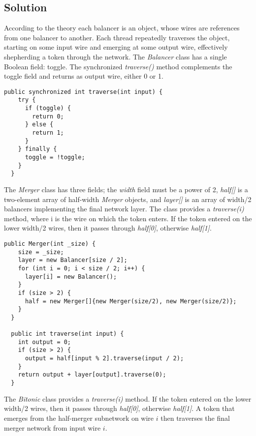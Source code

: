 \subsection{Solution}
\par
According to the theory each balancer is an object, whose wires are references from one balancer to another. Each thread repeatedly traverses the object, starting on some input wire and emerging at some output wire, effectively shepherding a token through the network.
The \textit{Balancer} class has a single Boolean field: toggle. The synchronized \textit{traverse()} method complements the toggle field and returns as output wire, either 0 or 1. 
\par
\begin{lstlisting}[frame=single,breaklines=true]
  public synchronized int traverse(int input) {
    try {
      if (toggle) {
        return 0;
      } else {
        return 1;
      }
    } finally {
      toggle = !toggle;
    }
  }
\end{lstlisting}
\par
The \textit{Merger} class has three fields; the \textit{width} field must be a power of 2, \textit{half[]} is a two-element array of half-width \textit{Merger} objects, and \textit{layer[]} is an array of width/2 balancers implementing the final network layer.
The class provides a \textit{traverse(i)} method, where i is the wire on which the token enters. If the token entered on the lower width/2 wires, then it passes through \textit{half[0]}, otherwise \textit{half[1]}.
\begin{lstlisting}[frame=single,breaklines=true]
  public Merger(int _size) {
    size = _size;
    layer = new Balancer[size / 2];
    for (int i = 0; i < size / 2; i++) {
      layer[i] = new Balancer();
    }
    if (size > 2) {
      half = new Merger[]{new Merger(size/2), new Merger(size/2)};
    }    
  }

  public int traverse(int input) {
    int output = 0;
    if (size > 2) {
      output = half[input % 2].traverse(input / 2);
    }
    return output + layer[output].traverse(0);
  }
\end{lstlisting}
\par
The \textit{Bitonic} class provides a \textit{traverse(i)} method. If the token entered on the lower width/2 wires, then it passes through \textit{half[0]}, otherwise \textit{half[1]}. A token that emerges from the half-merger subnetwork on wire $i$ then traverses the final merger network from input wire $i$.

